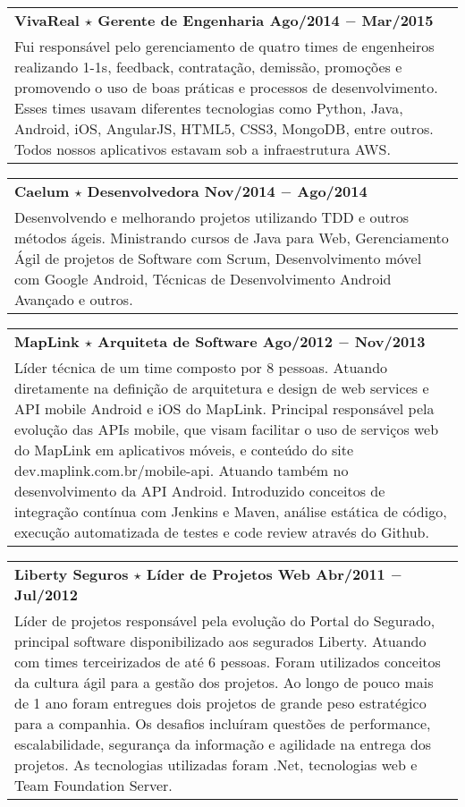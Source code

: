 \documentclass[a4paper, oneside, final]{scrartcl}
\newcommand{\vspc}{\vspace{0.15cm}} %
\begin{document}
\begin{center}
\begin{tabularx}{1\linewidth}{X}
{\bf VivaReal $\star$ Gerente de Engenharia \hfill Ago/2014 $-$ Mar/2015} \\
Fui responsável pelo gerenciamento de quatro times de engenheiros realizando 1-1s, feedback, contratação, demissão, promoções e promovendo o uso de boas práticas e processos de desenvolvimento. Esses times usavam diferentes tecnologias como Python, Java, Android, iOS, AngularJS, HTML5, CSS3, MongoDB, entre outros. Todos nossos aplicativos estavam sob a infraestrutura AWS. \vspc\\
\end{tabularx}

\begin{tabularx}{1\linewidth}{X}
{\bf Caelum $\star$ Desenvolvedora \hfill Nov/2014 $-$ Ago/2014} \\
Desenvolvendo e melhorando projetos utilizando TDD e outros métodos ágeis. Ministrando cursos de Java para Web, Gerenciamento Ágil de projetos de Software com Scrum, Desenvolvimento móvel com Google Android, Técnicas de Desenvolvimento Android Avançado e outros. \vspc\\
\end{tabularx}

\begin{tabularx}{1\linewidth}{X}
{\bf MapLink $\star$ Arquiteta de Software \hfill Ago/2012 $-$ Nov/2013} \\
Líder técnica de um time composto por 8 pessoas. Atuando diretamente na definição de arquitetura e design de web services e API mobile Android e iOS do MapLink. Principal responsável pela evolução das APIs mobile, que visam facilitar o uso de serviços web do MapLink em aplicativos móveis, e conteúdo do site dev.maplink.com.br/mobile-api. Atuando também no desenvolvimento da API Android. Introduzido conceitos de integração contínua com Jenkins e Maven, análise estática de código, execução automatizada de testes e code review através do Github. \vspc\\
\end{tabularx}

\begin{tabularx}{1\linewidth}{X}
{\bf Liberty Seguros $\star$ Líder de Projetos Web \hfill Abr/2011 $-$ Jul/2012} \\
Líder de projetos responsável pela evolução do Portal do Segurado, principal software disponibilizado aos segurados Liberty. Atuando com times terceirizados de até 6 pessoas. Foram utilizados conceitos da cultura ágil para a gestão dos projetos. Ao longo de pouco mais de 1 ano foram entregues dois projetos de grande peso estratégico para a companhia. Os desafios incluíram questões de performance, escalabilidade, segurança da informação e agilidade na entrega dos projetos. As tecnologias utilizadas foram .Net, tecnologias web e Team Foundation Server.\vspc\\
\end{tabularx}


\end{center}
\end{document}
